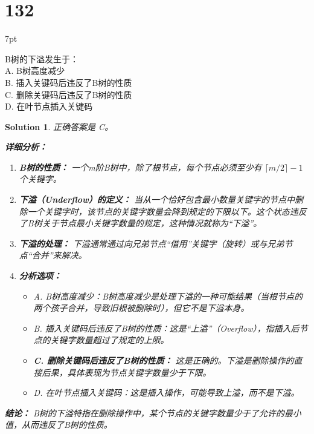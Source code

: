 \documentclass[UTF8]{report}
\newtheorem{solution}{Solution}
\theoremstyle{MyLineTheoremStyle} %
\theoremstyle{MyBlockTheoremStyle} %
\theoremstyle{MySubsubsectionStyle} %
\newenvironment{graybox}{%
        \def\FrameCommand{%
        \hspace{1pt}%
        {\color{gray}\small \vrule width 2pt}%
        {\color{graybox_color}\vrule width 4pt}%
        \colorbox{graybox_color}%
        }%
        \MakeFramed{\advance\hsize-\width\FrameRestore}%
        \noindent\hspace{-4.55pt}%
        \begin{adjustwidth}{}{7pt}%
        \vspace{2pt}\vspace{2pt}%
        }
        {%
        \vspace{2pt}\end{adjustwidth}\endMakeFramed%
        }
\begin{document}
\section*{132}
\begin{graybox}
B树的下溢发生于：\\
A. B树高度减少\\
B. 插入关键码后违反了B树的性质\\
C. 删除关键码后违反了B树的性质\\
D. 在叶节点插入关键码
\end{graybox}

\begin{solution}
正确答案是 C。

\textbf{详细分析：}

\begin{enumerate}
    \item \textbf{B树的性质：}
    一个m阶B树中，除了根节点，每个节点必须至少有 $\lceil m/2 \rceil - 1$ 个关键字。

    \item \textbf{下溢（Underflow）的定义：}
    当从一个恰好包含最小数量关键字的节点中删除一个关键字时，该节点的关键字数量会降到规定的下限以下。这个状态违反了B树关于节点最小关键字数量的规定，这种情况就称为“下溢”。

    \item \textbf{下溢的处理：}
    下溢通常通过向兄弟节点“借用”关键字（旋转）或与兄弟节点“合并”来解决。

    \item \textbf{分析选项：}
    \begin{itemize}
        \item A. B树高度减少：B树高度减少是处理下溢的一种可能结果（当根节点的两个孩子合并，导致旧根被删除时），但它不是下溢本身。
        \item B. 插入关键码后违反了B树的性质：这是“上溢”（Overflow），指插入后节点的关键字数量超过了规定的上限。
        \item \textbf{C. 删除关键码后违反了B树的性质：} 这是正确的。下溢是删除操作的直接后果，具体表现为节点关键字数量少于下限。
        \item D. 在叶节点插入关键码：这是插入操作，可能导致上溢，而不是下溢。
    \end{itemize}
\end{enumerate}

\textbf{结论：}
B树的下溢特指在删除操作中，某个节点的关键字数量少于了允许的最小值，从而违反了B树的性质。
\end{solution}
\end{document}
